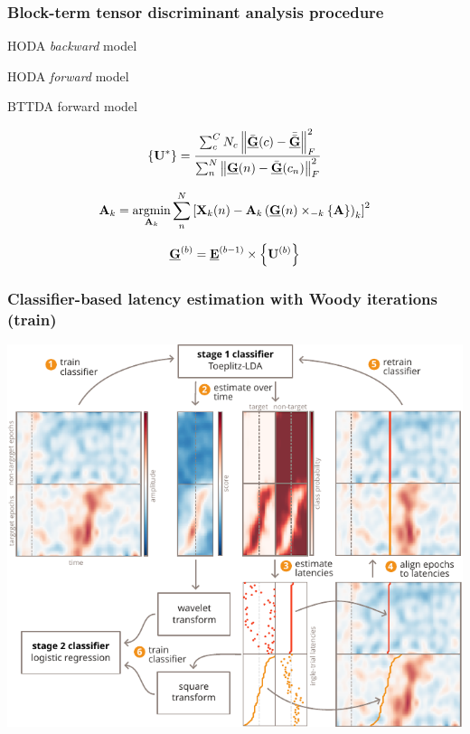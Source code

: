 \documentclass{kul-ulille-beamer}
\begin{document}
\begin{frame}[noframenumbering]
  \small

  \frametitle{Block-term tensor discriminant analysis procedure}
  \begin{minipage}[t]{.5\textwidth}
    HODA \emph{backward} model
    \bigskip

    \resizebox{.65\textwidth}{!}{
      
    }
  \end{minipage}\hfill%
  \begin{minipage}[t]{.5\textwidth}
    HODA \emph{forward} model
    \smallskip
    \hfill

    \resizebox{\textwidth}{!}{
      
    }
  \end{minipage}
  \vfill

  \begin{minipage}[c]{.5\textwidth}
  \bigskip
  BTTDA forward model
  \smallskip

    \resizebox{\textwidth}{!}{
      
    }
  \end{minipage}\hfill%
  \begin{minipage}[c]{.5\textwidth}
  \tiny

	$$\left\{\mat{U}^*\right\}  = \frac{\sum_c^CN_c\left\|\bar{\ten{G}}(c)-\bar{\bar{\ten{G}}}\right\|_F^2}
	{\sum_n^N\left\|\ten{G}(n)-\bar{\ten{G}}(c_n)\right\|_F^2}$$

	$$\mat{A}_k = \argmin_{\mat{A}_k}
	\sum_n^N\left[\mat{X}_k(n) -
		\mat{A}_k\left(\ten{G}(n)\mmprs{\mat{A}}{k}\right)_k\right]^2$$

  $$\ten{G}^{(b)} = \ten{E}^{(b-1)}\mmpr{\mat{U}^{(b)}}$$



  \end{minipage}
\end{frame}

\begin{frame}[noframenumbering]
  \frametitle{Classifier-based latency estimation with Woody iterations (train)}
  \centering
  \includegraphics[width=.6\textwidth]{figures/covert/figure1.pdf}
\end{frame}
\end{document}
